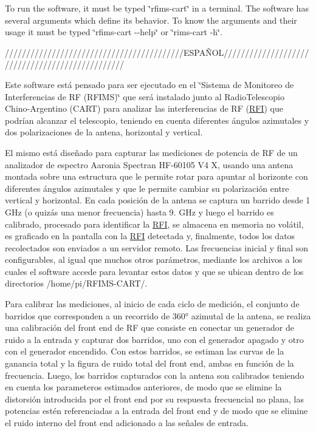 To run the software, it must be typed \char`\"{}rfims-\/cart\char`\"{} in a terminal. The software has several arguments which define its behavior. To know the arguments and their usage it must be typed \char`\"{}rfims-\/cart -\/-\/help\char`\"{} or \char`\"{}rims-\/cart -\/h\char`\"{}.

//////////////////////////////////////////\+E\+S\+P\+AÑ\+O\+L////////////////////////////////////////////////

Este software está pensado para ser ejecutado en el \char`\"{}\+Sistema de Monitoreo de Interferencias de R\+F (\+R\+F\+I\+M\+S)\char`\"{} que será instalado junto al Radio\+Telescopio Chino-\/\+Argentino (C\+A\+RT) para analizar las interferencias de RF (\hyperlink{structRFI}{R\+FI}) que podrían alcanzar el telescopio, teniendo en cuenta diferentes ángulos azimutales y dos polarizaciones de la antena, horizontal y vertical.

El mismo está diseñado para capturar las mediciones de potencia de RF de un analizador de espectro Aaronia Spectran H\+F-\/60105 V4 X, usando una antena montada sobre una estructura que le permite rotar para apuntar al horizonte con diferentes ángulos azimutales y que le permite cambiar su polarización entre vertical y horizontal. En cada posición de la antena se captura un barrido desde 1 G\+Hz (o quizás una menor frecuencia) hasta 9. G\+Hz y luego el barrido es calibrado, procesado para identificar la \hyperlink{structRFI}{R\+FI}, se almacena en memoria no volátil, es graficado en la pantalla con la \hyperlink{structRFI}{R\+FI} detectada y, finalmente, todos los datos recolectados son enviados a un servidor remoto. Las frecuencias inicial y final son configurables, al igual que muchos otros parámetros, mediante los archivos a los cuales el software accede para levantar estos datos y que se ubican dentro de los directorios /home/pi/\+R\+F\+I\+M\+S-\/\+C\+A\+R\+T/.

Para calibrar las mediciones, al inicio de cada ciclo de medición, el conjunto de barridos que corresponden a un recorrido de 360° azimutal de la antena, se realiza una calibración del front end de RF que consiste en conectar un generador de ruido a la entrada y capturar dos barridos, uno con el generador apagado y otro con el generador encendido. Con estos barridos, se estiman las curvas de la ganancia total y la figura de ruido total del front end, ambas en función de la frecuencia. Luego, los barridos capturados con la antena son calibrados teniendo en cuenta los parameteros estimados anteriores, de modo que se elimine la distorsión introducida por el front end por su respuesta frecuencial no plana, las potencias estén referenciadas a la entrada del front end y de modo que se elimine el ruido interno del front end adicionado a las señales de entrada.

